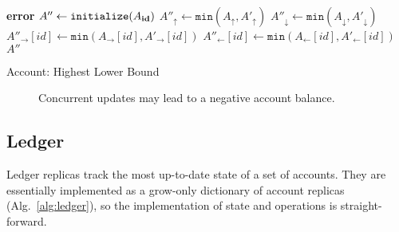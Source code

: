 \documentclass[9pt, oneside]{article}   	%
\begin{document}
\begin{algorithm}
\begin{algorithmic}[1]
     
		\textbf{error}
	\EndIf
	\State
        \State $A'' \leftarrow \texttt{initialize}(A_{\footnotesize \textbf{id}})$
        \State $A''_\uparrow \leftarrow \texttt{min}(A_\uparrow, A'_\uparrow)$
        \State $A''_\downarrow \leftarrow \texttt{min}(A_\downarrow, A'_\downarrow)$ 
	 
		\State $A''_{\rightarrow}[id] \leftarrow \texttt{min}(A_{\rightarrow}[id], A'_{\rightarrow}[id])$
	\EndFor
	 
		\State $A''_{\leftarrow}[id] \leftarrow \texttt{min}(A_{\leftarrow}[id], A'_{\leftarrow}[id])$
	\EndFor
	\State \Return $A''$	
    \EndFunction
\end{algorithmic}
\caption{\label{alg:account-hlb} Account: Highest Lower Bound}
\end{algorithm}


\begin{figure}

\caption{Concurrent updates may lead to a negative account balance.}
\label{fig:account-negative-bal}
\end{figure}


\subsection{Ledger}
\label{sec:ledger}

Ledger replicas track the most up-to-date state of a set of accounts. They are essentially implemented as a grow-only dictionary of account replicas (Alg.~\ref{alg:ledger}), so the implementation of state and operations is straight-forward.
\end{document}

